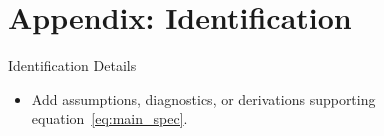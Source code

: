 \section{Appendix: Identification}

\begin{frame}[label=appendix-identification]{Identification Details}
  \begin{itemize}
    \item Add assumptions, diagnostics, or derivations supporting equation~\eqref{eq:main_spec}.
  \end{itemize}
\end{frame}
